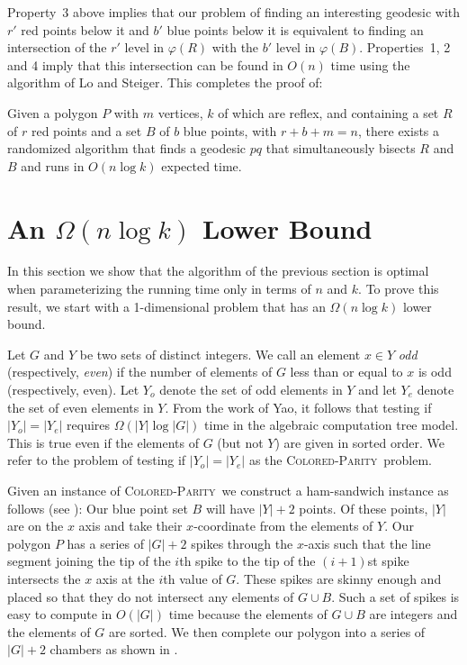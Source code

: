 \documentclass[charterfonts,lotsofwhite]{patmorin}
\newcommand{\dual}[1]{\varphi(#1)}
\newcommand{\parity}{\textsc{Colored-Parity}}
\begin{document}
Property~3 above implies that our problem of finding an interesting
geodesic with $r'$ red points below it and $b'$ blue points below it
is equivalent to finding an intersection of the $r'$ level in
$\dual{R}$ with the $b'$ level in $\dual{B}$.  Properties~1, 2 and 4
imply that this intersection can be found in $O(n)$ time using the
algorithm of Lo and Steiger.  This completes the proof of:

\begin{thm}
Given a polygon $P$ with $m$ vertices, $k$ of which are reflex, and
containing a set $R$ of $r$ red points and a set $B$ of $b$ blue
points, with $r+b+m=n$, there exists a randomized algorithm that finds
a geodesic $pq$ that simultaneously bisects $R$ and $B$ and runs in
$O(n\log k)$ expected time.
\end{thm}

\section{An \boldmath $\Omega(n\log k)$ Lower Bound}

In this section we show that the algorithm of the previous section is
optimal when parameterizing the running time only in terms of $n$ and
$k$.  To prove this result, we start with a 1-dimensional problem that
has an $\Omega(n\log k)$ lower bound.

Let $G$ and $Y$ be two sets of distinct integers.  We call an element
$x\in Y$ \emph{odd} (respectively, \emph{even}) if the number of
elements of $G$ less than or equal to $x$ is odd (respectively, even).
Let $Y_o$ denote the set of odd elements in $Y$ and let $Y_e$ denote
the set of even elements in $Y$.  From the work of Yao, it follows
that testing if $|Y_o|=|Y_e|$ requires $\Omega(|Y|\log |G|)$ time in
the algebraic computation tree model.  This is true even if the
elements of $G$ (but not $Y$) are given in sorted order.  We refer to
the problem of testing if $|Y_o|=|Y_e|$ as the \parity\  problem. 


Given an instance of \parity\ we construct a ham-sandwich instance as
follows (see ):  Our blue point set $B$
will have $|Y|+2$ points.  Of these points, $|Y|$ are on the $x$ axis
and take their $x$-coordinate from the elements of $Y$.  Our polygon
$P$ has a series of $|G|+2$ spikes through the $x$-axis such that the
line segment joining the tip of the $i$th spike to the tip of the
$(i+1)$st spike intersects the $x$ axis at the $i$th value of $G$.
These spikes are skinny enough and placed so that they do not
intersect any elements of $G\cup B$.  Such a set of spikes is easy to
compute in $O(|G|)$ time because the elements of $G\cup B$ are
integers and the elements of $G$ are sorted.  We then complete our
polygon into a series of $|G|+2$ chambers as shown in
.
\end{document}
